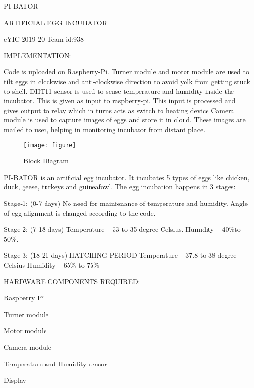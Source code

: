 \documentclass[12pt]{article}
\begin{document}
\centering
PI-BATOR

ARTIFICIAL EGG INCUBATOR


eYIC 2019-20 Team id:938





\begin{flushleft}

IMPLEMENTATION:

Code is uploaded on Raspberry-Pi.
Turner module and motor module are used to tilt eggs in clockwise and anti-clockwise direction to avoid yolk from getting stuck to shell.
 DHT11 sensor is used to sense temperature and humidity inside the incubator. This is given as input to raspberry-pi.
This input is processed and gives output to relay which in turns acts as switch to heating device
Camera module is used to capture images of eggs and store it in cloud. These images are mailed to user, helping in monitoring incubator from distant place.

\end{flushleft}


\begin{figure}
[h]
\begin{center}
\texttt{[image: figure]}
\caption{Block Diagram}
\end{center}
\end{figure}


\begin{flushleft}
PI-BATOR is an artificial egg incubator. It incubates 5 types of eggs like chicken, duck, geese, turkeys and guineafowl. The egg incubation happens in 3 stages:

Stage-1: (0-7 days) No need for maintenance of temperature and 
                   humidity.    
	       Angle of egg alignment is changed according to the code.

Stage-2: (7-18 days) Temperature – 33 to 35 degree Celsius.
                   Humidity – 40\%to 50\%.

Stage-3: (18-21 days) HATCHING PERIOD
                     Temperature – 37.8 to 38 degree Celsius
                      Humidity – 65\% to 75\%

\end{flushleft}



\begin{flushleft}

HARDWARE COMPONENTS REQUIRED:

Raspberry Pi

Turner module

Motor module

Camera module

Temperature and Humidity sensor

Display

\end{flushleft}
\end{document}
